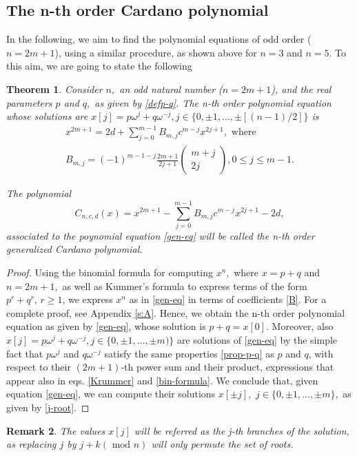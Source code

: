 \documentclass[11pt,reqno]{amsart}
\newtheorem{theorem}{Theorem}[section]
\newtheorem{remark}[theorem]{Remark}
\begin{document}
\subsection{The n-th order Cardano  polynomial}\label{s:2}
In the following, we aim to find the polynomial equations of odd order ($n=2m+1$), using a similar procedure, as shown above for $n=3$ and $n=5$. To this aim, we are going to state the following 
\begin{theorem} Consider $n,$ an odd natural number ($n=2m+1 $), and the real parameters $p$ and $q,$ as given by \eqref{defp-q}.
 The n-th order polynomial equation whose solutions are $x[j]=p\omega^j+q\omega^{-j}, j\in\{0,\pm1,\ldots, \pm [(n-1)/2]\}$ is
 \begin{eqnarray}
x^{2m+1}=2d+\sum\limits_{j=0}^{m-1}B_{m,j}c^{m-j}x^{2j+1}, \text{ where }\label{gen-eq}
\\ B_{m,j}=(-1)^{m-1-j}\frac{2m+1}{2j+1}\begin{pmatrix}
        m+j\\2j
    \end{pmatrix}, 0\leq j\leq m-1.
    \label{B}
\end{eqnarray}

      The polynomial \begin{equation}\label{Car-pol}
          C_{n,c,d}(x)=x^{2m+1}-\sum\limits_{j=0}^{m-1}B_{m,j}c^{m-j}x^{2j+1}-2d,
      \end{equation} associated to the poynomial equation \eqref{gen-eq}  will be called \textit{the n-th order generalized Cardano   polynomial}.
\end{theorem}
\begin{proof}
    Using the binomial formula for computing $x^n,$ where $x=p+q$ and $n=2m+1,$
    as well as Kummer's formula\cite{Ma2005} to express terms of the form $p^r+q^r,\, r\geq 1$, we express $x^n$ as in \eqref{gen-eq} in terms of coefficients \eqref{B}. For a complete proof, see Appendix \eqref{s:A}.    
    Hence, we obtain the n-th order polynomial equation as given by \eqref{gen-eq},  whose solution is $p+q=x[0]$. Moreover, also  $x[j]=p\omega^j+q\omega^{-j}, j\in\{0,\pm1,\ldots, \pm m)\}$ are solutions of \eqref{gen-eq} by the simple fact that $p\omega^{j}$ and $q\omega^{-j}$ satisfy the same properties \eqref{prop-p-q} as $p$ and $q$, with respect to their $(2m+1)$-th power sum and their product, expressions that appear also in eqs. \eqref{Krummer} and \eqref{bin-formula}. We conclude that, given equation \eqref{gen-eq}, we can compute their  solutions $x[\pm j],\,\, j\in\{0,\pm1,\ldots,\pm m\},$ as given by \eqref{j-root}. 
\end{proof}
\begin{remark}
    The values $x[j]$ will be referred as the j-th branches of the solution, as replacing $j$ by $j+k (\text{ mod } n)$ will only permute the set of roots.
\end{remark}
\end{document}
